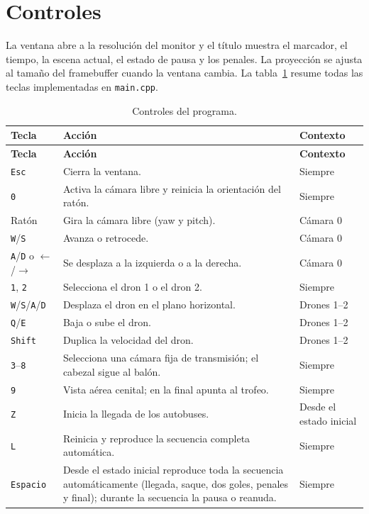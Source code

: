\documentclass[12pt,letterpaper]{article}
\begin{document}
\section{Controles}
La ventana abre a la resolución del monitor y el título muestra el marcador, el tiempo, la escena
actual, el estado de pausa y los penales. La proyección se ajusta al tamaño del framebuffer cuando
la ventana cambia. La tabla~\ref{tab:controles} resume todas las teclas implementadas
en \texttt{main.cpp}.

\begin{longtable}{p{}p{}p{}}
\caption{Controles del programa.}\label{tab:controles}\\
\toprule
\textbf{Tecla} & \textbf{Acción} & \textbf{Contexto}\\
\midrule
\endfirsthead
\toprule
\textbf{Tecla} & \textbf{Acción} & \textbf{Contexto}\\
\midrule
\endhead
\bottomrule
\endfoot
\texttt{Esc} & Cierra la ventana. & Siempre\\
\texttt{0} & Activa la cámara libre y reinicia la orientación del ratón. & Siempre\\
Ratón & Gira la cámara libre (yaw y pitch). & Cámara 0\\
\texttt{W}/\texttt{S} & Avanza o retrocede. & Cámara 0\\
\texttt{A}/\texttt{D} o $\leftarrow$/$\rightarrow$ & Se desplaza a la izquierda o a la derecha. & Cámara 0\\
\texttt{1}, \texttt{2} & Selecciona el dron 1 o el dron 2. & Siempre\\
\texttt{W}/\texttt{S}/\texttt{A}/\texttt{D} & Desplaza el dron en el plano horizontal. & Drones 1--2\\
\texttt{Q}/\texttt{E} & Baja o sube el dron. & Drones 1--2\\
\texttt{Shift} & Duplica la velocidad del dron. & Drones 1--2\\
\texttt{3}--\texttt{8} & Selecciona una cámara fija de transmisión; el cabezal sigue al balón. & Siempre\\
\texttt{9} & Vista aérea cenital; en la final apunta al trofeo. & Siempre\\
\texttt{Z} & Inicia la llegada de los autobuses. & Desde el estado inicial\\
\texttt{L} & Reinicia y reproduce la secuencia completa automática. & Siempre\\
\texttt{Espacio} & Desde el estado inicial reproduce toda la secuencia automáticamente (llegada, saque, dos goles, penales y final); durante la secuencia la pausa o reanuda. & Siempre\\

\end{longtable}
\end{document}
